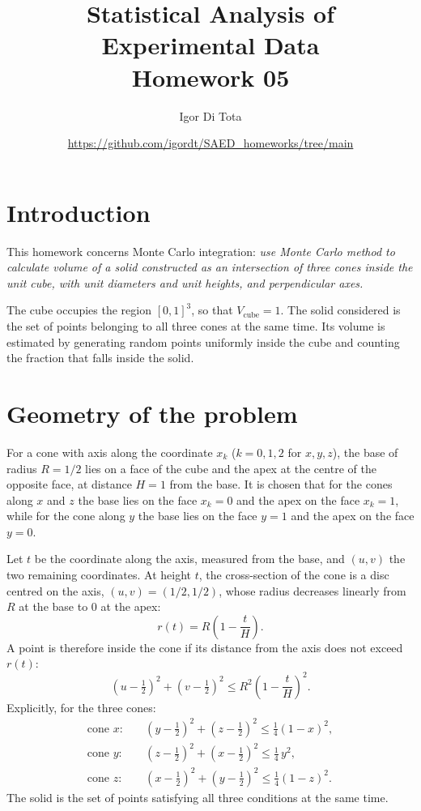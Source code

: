 \documentclass[11pt,a4paper]{article}
\title{Statistical Analysis of Experimental Data\\
	\vspace{0.2cm}
	\large{Homework 05}}
\author{Igor Di Tota}
\date{\small \url{https://github.com/igordt/SAED_homeworks/tree/main}}
\begin{document}
	\maketitle
	
	\section*{Introduction}

	This homework concerns Monte Carlo integration: \textit{use Monte Carlo method to calculate volume of a solid constructed as an intersection of three cones inside the unit cube, with unit diameters and unit heights, and perpendicular axes.}

	The cube occupies the region $[0,1]^3$, so that $V_{\text{cube}} = 1$.
	The solid considered is the set of points belonging to all three cones at the same time.
	Its volume is estimated by generating random points uniformly inside the cube and counting the fraction that falls inside the solid.
	\section*{Geometry of the problem}

	For a cone with axis along the coordinate $x_k$ ($k = 0, 1, 2$ for $x, y, z$), the base of radius $R = 1/2$ lies on a face of the cube and the apex at the centre of the opposite face, at distance $H = 1$ from the base.
	It is chosen that for the cones along $x$ and $z$ the base lies on the face $x_k = 0$ and the apex on the face $x_k = 1$, while for the cone along $y$ the base lies on the face $y = 1$ and the apex on the face $y = 0$.

	Let $t$ be the coordinate along the axis, measured from the base, and $(u, v)$ the two remaining coordinates.
	At height $t$, the cross-section of the cone is a disc centred on the axis, $(u, v) = (1/2, 1/2)$, whose radius decreases linearly from $R$ at the base to $0$ at the apex:
	\begin{equation}
		r(t) = R \left(1 - \frac{t}{H}\right).
	\end{equation}
	A point is therefore inside the cone if its distance from the axis does not exceed $r(t)$:
	\begin{equation}
		\left(u - \tfrac{1}{2}\right)^2 + \left(v - \tfrac{1}{2}\right)^2 \le R^2 \left(1 - \frac{t}{H}\right)^2 .
	\end{equation}
	Explicitly, for the three cones:
	\begin{equation}
		\begin{aligned}
			\text{cone } x: &\quad (y - \tfrac12)^2 + (z - \tfrac12)^2 \le \tfrac14 (1 - x)^2, \\
			\text{cone } y: &\quad (z - \tfrac12)^2 + (x - \tfrac12)^2 \le \tfrac14\, y^2, \\
			\text{cone } z: &\quad (x - \tfrac12)^2 + (y - \tfrac12)^2 \le \tfrac14 (1 - z)^2 .
		\end{aligned}
	\end{equation}
	The solid is the set of points satisfying all three conditions at the same time.
\end{document}
